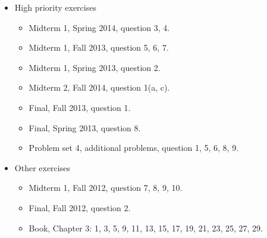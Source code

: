 \documentclass[11pt]{article}
\begin{document}
\begin{itemize}
\item High priority exercises
	\begin{itemize}
		\item Midterm 1, Spring 2014, question 3, 4.
		\item Midterm 1, Fall 2013, question 5, 6, 7.
		\item Midterm 1, Spring 2013, question 2.
		\item Midterm 2, Fall 2014, question 1(a, c).
		\item Final, Fall 2013, question 1.
		\item Final, Spring 2013, question 8.
		\item Problem set 4, additional problems, question 1, 5, 6, 8, 9.
	\end{itemize}
\item Other exercises
	\begin{itemize}
		\item Midterm 1, Fall 2012, question 7, 8, 9, 10.
		\item Final, Fall 2012, question 2.
		\item Book, Chapter 3: 1, 3, 5, 9, 11, 13, 15, 17, 19, 21, 23, 25, 27, 29.
	\end{itemize}
\end{itemize}
\end{document}
